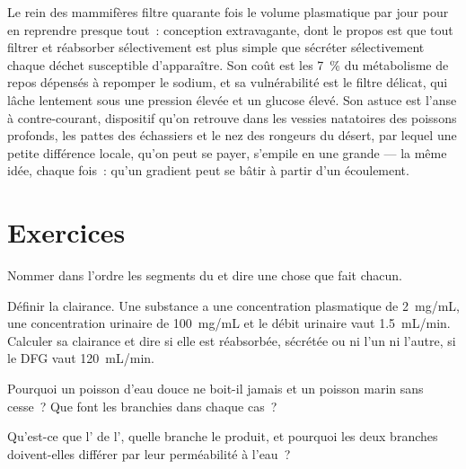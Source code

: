 \begin{remark}\label{rem:b3:renal-osmoregulation:design}
Le rein des mammifères filtre quarante fois le volume plasmatique par
jour pour en reprendre presque tout~: conception extravagante, dont le
propos est que tout filtrer et réabsorber sélectivement est plus simple
que sécréter sélectivement chaque déchet susceptible d'apparaître. Son
coût est les \qty{7}{\%} du métabolisme de repos dépensés à repomper le
sodium, et sa vulnérabilité est le filtre délicat, qui lâche lentement
sous une pression élevée et un glucose élevé. Son astuce est l'anse à
contre-courant, dispositif qu'on retrouve dans les vessies natatoires
des poissons profonds, les pattes des échassiers et le nez des rongeurs
du désert, par lequel une petite différence locale, qu'on peut se payer,
s'empile en une grande --- la même idée, chaque fois~: qu'un gradient
peut se bâtir à partir d'un écoulement.
\end{remark}

\section{Exercices}

\begin{exercise}[$\star$]\label{exo:b3:renal-osmoregulation:1}
Nommer dans l'ordre les segments du  et dire une chose que fait
chacun.
\end{exercise}

\begin{exercise}[$\star$]\label{exo:b3:renal-osmoregulation:2}
Définir la clairance. Une substance a une concentration plasmatique de
\qty{2}{mg/mL}, une concentration urinaire de \qty{100}{mg/mL} et le
débit urinaire vaut \qty{1.5}{mL/min}. Calculer sa clairance et dire si
elle est réabsorbée, sécrétée ou ni l'un ni l'autre, si le DFG vaut
\qty{120}{mL/min}.
\end{exercise}

\begin{exercise}[$\star$]\label{exo:b3:renal-osmoregulation:3}
Pourquoi un poisson d'eau douce ne boit-il jamais et un poisson marin
sans cesse~? Que font les branchies dans chaque cas~?
\end{exercise}

\begin{exercise}[$\star$]\label{exo:b3:renal-osmoregulation:4}
Qu'est-ce que l' de l', quelle branche le
produit, et pourquoi les deux branches doivent-elles différer par leur
perméabilité à l'eau~?
\end{exercise}

